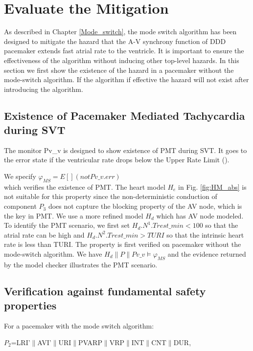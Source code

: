 \section{Evaluate the Mitigation}
As described in Chapter \ref{Mode_switch}, the mode switch algorithm has been designed to mitigate the hazard that the A-V synchrony function of DDD pacemaker extends fast
atrial rate to the ventricle. It is important to ensure the effectiveness of the algorithm without inducing other top-level hazards. In this section we first show the existence of the hazard in a pacemaker without the mode-switch algorithm. If the algorithm if effective the hazard will not exist after introducing the algorithm.

\subsection{Existence of Pacemaker Mediated Tachycardia during SVT}
The monitor \textsf{Pv\_v} is designed to show existence of PMT during SVT. It goes to the error state if the ventricular rate drops below the Upper Rate Limit ().  


We specify 
$\varphi_{MS}=E[] (not Pv\_v.err)$\\
which verifies the existence of PMT. The heart model $H_e$ in Fig. \ref{fig:HM_abs} is not suitable for this property since the non-deterministic conduction of component $P_3$ does not capture the blocking property of the AV node, which is the key in PMT. We use a more refined model $H_d$ which has AV node modeled. To identify the PMT scenario, we first set $H_d.N^1.Trest\_min<100$ so that the atrial rate can be high and $H_d.N^2.Trest\_min>TURI$ so that the intrinsic heart rate is less than TURI. The property is first verified on pacemaker without the mode-switch algorithm. We have $H_d\|P\|Pv\_v\models\varphi_{MS}$ and the evidence returned by the model checker illustrates the PMT scenario.

\subsection{Verification against fundamental safety properties}
For a pacemaker with the mode switch algorithm: 

$P_2$=\textsf{LRI'$\|$AVI'$\|$URI$\|$PVARP$\|$VRP$\|$INT$\|$CNT$\|$DUR}, 

